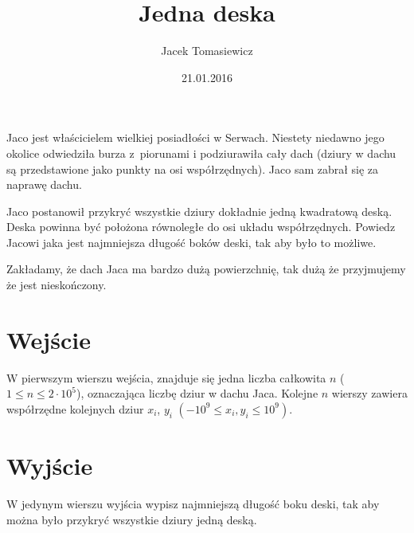 \documentclass[zad,zawodnik,utf8]{sinol}
\title{Jedna deska}
\author{Jacek Tomasiewicz} %
\date{21.01.2016}
\begin{document}
  \begin{tasktext}%
	Jaco jest właścicielem wielkiej posiadłości w Serwach.
Niestety niedawno jego okolice odwiedziła burza z~piorunami i podziurawiła cały dach (dziury w dachu są przedstawione jako punkty na osi współrzędnych). Jaco sam zabrał się za naprawę dachu. 

Jaco postanowił przykryć wszystkie dziury dokładnie jedną kwadratową deską.
Deska powinna być położona równoległe do osi układu współrzędnych.
Powiedz Jacowi jaka jest najmniejsza długość boków deski, tak aby było to możliwe.

Zakładamy, że dach Jaca ma bardzo dużą powierzchnię, tak dużą że przyjmujemy że jest nieskończony. 

    \section{Wejście}
	W pierwszym wierszu wejścia, znajduje się jedna liczba całkowita $n$ ($1 \leq n \leq 2 \cdot 10^5$),
oznaczająca liczbę dziur w dachu Jaca. Kolejne $n$ wierszy zawiera współrzędne kolejnych dziur $x_i$, $y_i$
$(-10^9 \leq x_i, y_i \leq 10^9)$.

    \section{Wyjście}
	W jedynym wierszu wyjścia wypisz najmniejszą długość boku deski, tak aby można było przykryć wszystkie dziury jedną deską.

    \makecompactexample

  \end{tasktext}
\end{document}
